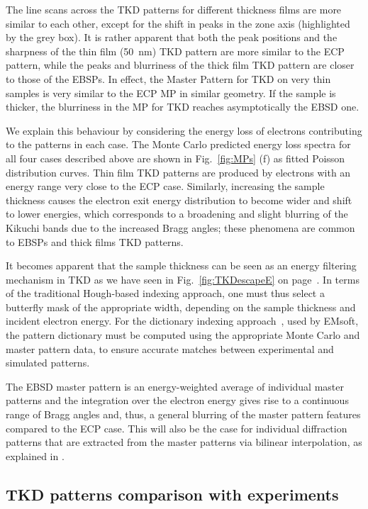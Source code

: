 The line scans across the TKD patterns for different thickness films are more similar to each other, except for the shift in peaks in the zone axis (highlighted by the grey box). It is rather apparent that both the peak positions and the sharpness of the thin film (50~nm) TKD pattern are more similar to the ECP pattern, while the peaks and blurriness of the thick film TKD pattern are closer to those of the EBSPs. In effect, the Master Pattern for TKD on very thin samples is very similar to the ECP MP in similar geometry. If the sample is thicker, the blurriness in the MP for TKD reaches asymptotically the EBSD one. 

We explain this behaviour by considering the energy loss of electrons contributing to the patterns in each case. The Monte Carlo predicted energy loss spectra for all four cases described above are shown in Fig.~\ref{fig:MPs} (f) as fitted Poisson distribution curves. Thin film TKD patterns are produced by electrons with an energy range very close to the ECP case. Similarly, increasing the sample thickness causes the electron exit energy distribution to become wider and shift to lower energies, which corresponds to a broadening and slight blurring of the Kikuchi bands due to the increased Bragg angles; these phenomena are common to EBSPs and thick films TKD patterns. 


It becomes apparent that the sample thickness can be seen as an energy filtering mechanism in TKD as we have seen in Fig.~\ref{fig:TKDescapeE} on page~\pageref{fig:TKDescapeE}. In terms of the traditional Hough-based indexing approach, one must thus select a butterfly mask of the appropriate width, depending on the sample thickness and incident electron energy. For the dictionary indexing approach~\cite{Marquardt17}, used by EMsoft, the pattern dictionary must be computed using the appropriate Monte Carlo and master pattern data, to ensure accurate matches between experimental and simulated patterns.



The EBSD master pattern is an energy-weighted average of individual master patterns and the integration over the electron energy gives rise to a continuous range of Bragg angles and, thus, a general blurring of the master pattern features compared to the ECP case. This will also be the case for individual diffraction patterns that are extracted from the master patterns via bilinear interpolation, as explained in \cite{degraef2013e}.


\subsection{TKD patterns comparison with experiments}

